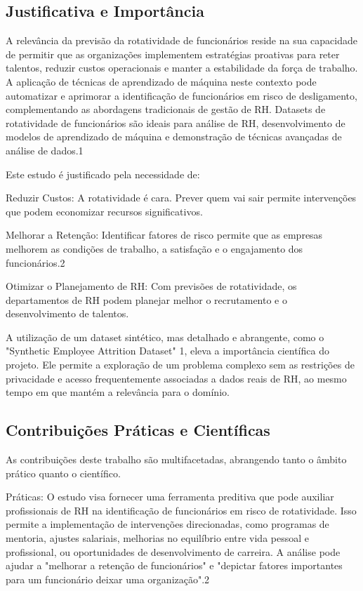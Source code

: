 \documentclass[sigconf]{acmart}
\begin{document}
\subsection{Justificativa e Importância}
A relevância da previsão da rotatividade de funcionários reside na sua capacidade de permitir que as organizações implementem estratégias proativas para reter talentos, reduzir custos operacionais e manter a estabilidade da força de trabalho. A aplicação de técnicas de aprendizado de máquina neste contexto pode automatizar e aprimorar a identificação de funcionários em risco de desligamento, complementando as abordagens tradicionais de gestão de RH. Datasets de rotatividade de funcionários são ideais para análise de RH, desenvolvimento de modelos de aprendizado de máquina e demonstração de técnicas avançadas de análise de dados.1

Este estudo é justificado pela necessidade de:

Reduzir Custos: A rotatividade é cara. Prever quem vai sair permite intervenções que podem economizar recursos significativos.

Melhorar a Retenção: Identificar fatores de risco permite que as empresas melhorem as condições de trabalho, a satisfação e o engajamento dos funcionários.2

Otimizar o Planejamento de RH: Com previsões de rotatividade, os departamentos de RH podem planejar melhor o recrutamento e o desenvolvimento de talentos.

A utilização de um dataset sintético, mas detalhado e abrangente, como o "Synthetic Employee Attrition Dataset" 1, eleva a importância científica do projeto. Ele permite a exploração de um problema complexo sem as restrições de privacidade e acesso frequentemente associadas a dados reais de RH, ao mesmo tempo em que mantém a relevância para o domínio.

\subsection{Contribuições Práticas e Científicas}
As contribuições deste trabalho são multifacetadas, abrangendo tanto o âmbito prático quanto o científico.

Práticas: O estudo visa fornecer uma ferramenta preditiva que pode auxiliar profissionais de RH na identificação de funcionários em risco de rotatividade. Isso permite a implementação de intervenções direcionadas, como programas de mentoria, ajustes salariais, melhorias no equilíbrio entre vida pessoal e profissional, ou oportunidades de desenvolvimento de carreira. A análise pode ajudar a "melhorar a retenção de funcionários" e "depictar fatores importantes para um funcionário deixar uma organização".2
\end{document}
